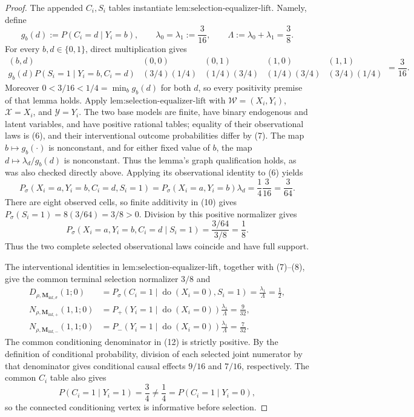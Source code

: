 \documentclass{article}
\begin{document}
\begin{proof}
The appended \(C_i,S_i\) tables instantiate \(\text{lem:selection-equalizer-lift}\).  Namely, define
\[
 g_b(d):=P(C_i=d\mid Y_i=b),
 \qquad \lambda_0=\lambda_1:=\frac3{16},
 \qquad \Lambda:=\lambda_0+\lambda_1=\frac38.          \tag{8}
\]
For every \(b,d\in\{0,1\}\), direct multiplication gives
\[
\begin{array}{c|cccc}
 (b,d)&(0,0)&(0,1)&(1,0)&(1,1)\\ \hline
 g_b(d)P(S_i=1\mid Y_i=b,C_i=d)
 &(3/4)(1/4)&(1/4)(3/4)&(1/4)(3/4)&(3/4)(1/4)
\end{array}
=\frac3{16}.                                             \tag{9}
\]
Moreover \(0<3/16<1/4=\min_b g_b(d)\) for both \(d\), so every positivity premise of that lemma holds.  Apply \(\text{lem:selection-equalizer-lift}\) with \(\mathcal W=(X_i,Y_i)\), \(\mathcal X=X_i\), and \(\mathcal Y=Y_i\).  The two base models are finite, have binary endogenous and latent variables, and have positive rational tables; equality of their observational laws is (6), and their interventional outcome probabilities differ by (7).  The map \(b\mapsto g_b(\cdot)\) is nonconstant, and for either fixed value of \(b\), the map \(d\mapsto\lambda_d/g_b(d)\) is nonconstant.  Thus the lemma's graph qualification holds, as was also checked directly above.  Applying its observational identity to (6) yields
\[
 P_\sigma(X_i=a,Y_i=b,C_i=d,S_i=1)
 =P_\sigma(X_i=a,Y_i=b)\lambda_d
 =\frac14\frac3{16}=\frac3{64}.                         \tag{10}
\]
There are eight observed cells, so finite additivity in (10) gives \(P_\sigma(S_i=1)=8(3/64)=3/8>0\).  Division by this positive normalizer gives
\[
 P_\sigma(X_i=a,Y_i=b,C_i=d\mid S_i=1)
 =\frac{3/64}{3/8}=\frac18.                              \tag{11}
\]
Thus the two complete selected observational laws coincide and have full support.

The interventional identities in \(\text{lem:selection-equalizer-lift}\), together with (7)--(8), give the common terminal selection normalizer \(3/8\) and
\[
\begin{aligned}
 D_{\rho,\mathbf M_{\mathrm{inf},\sigma}}(1;0)
 &=P_\sigma(C_i=1\mid\operatorname{do}(X_i=0),S_i=1)
   =\frac{\lambda_1}{\Lambda}=\frac12,\\
 N_{\rho,\mathbf M_{\mathrm{inf},+}}(1,1;0)
 &=P_+(Y_i=1\mid\operatorname{do}(X_i=0))
   \frac{\lambda_1}{\Lambda}=\frac9{32},\\
 N_{\rho,\mathbf M_{\mathrm{inf},-}}(1,1;0)
 &=P_-(Y_i=1\mid\operatorname{do}(X_i=0))
   \frac{\lambda_1}{\Lambda}=\frac7{32}.              \tag{12}
\end{aligned}
\]
The common conditioning denominator in (12) is strictly positive.  By the definition of conditional probability, division of each selected joint numerator by that denominator gives conditional causal effects \(9/16\) and \(7/16\), respectively.  The common \(C_i\) table also gives
\[
 P(C_i=1\mid Y_i=1)=\frac34\ne\frac14
 =P(C_i=1\mid Y_i=0),                                   \tag{13}
\]
so the connected conditioning vertex is informative before selection.


\end{proof}
\end{document}
